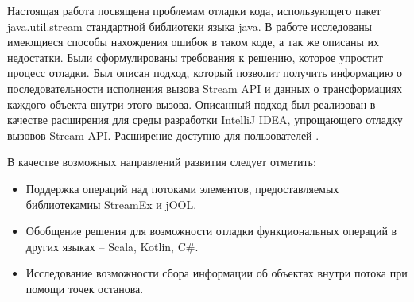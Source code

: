 Настоящая работа посвящена проблемам отладки кода, использующего пакет \\ java.util.stream стандартной библиотеки языка java. В работе исследованы имеющиеся способы нахождения ошибок в таком коде, а так же описаны их недостатки. Были сформулированы требования к решению, которое упростит процесс отладки. Был описан подход, который позволит получить информацию о последовательности исполнения вызова Stream API и данных о трансформациях каждого объекта внутри этого вызова. Описанный подход был реализован в качестве расширения для среды разработки IntelliJ IDEA, упрощающего отладку вызовов Stream API. Расширение доступно для пользователей \cite{java:stream-debugger}.

В качестве возможных направлений развития следует отметить:
\begin{itemize}
	\item Поддержка операций над потоками элементов, предоставляемых библиотекамиы StreamEx и jOOL.
	\item Обобщение решения для возможности отладки функциональных операций в других языках -- Scala, Kotlin, C\#.
	\item Исследование возможности сбора информации об объектах внутри потока при помощи точек останова.
\end{itemize}